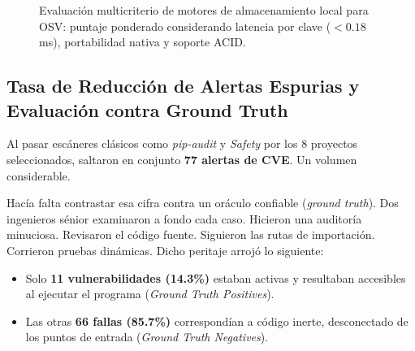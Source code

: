 \documentclass[conference]{IEEEtran}
\begin{document}
\begin{figure}[!htbp]
\centering
{}
\caption{Evaluación multicriterio de motores de almacenamiento local para OSV: puntaje ponderado considerando latencia por clave ($<0.18$ ms), portabilidad nativa y soporte ACID.}
\label{fig:evaluacion_bd}
\end{figure}

\subsection{Tasa de Reducción de Alertas Espurias y Evaluación contra Ground Truth}
Al pasar escáneres clásicos como \textit{pip-audit} y \textit{Safety} por los 8 proyectos seleccionados, saltaron en conjunto \textbf{77 alertas de CVE}. Un volumen considerable.

Hacía falta contrastar esa cifra contra un oráculo confiable (\textit{ground truth}). Dos ingenieros sénior examinaron a fondo cada caso. Hicieron una auditoría minuciosa. Revisaron el código fuente. Siguieron las rutas de importación. Corrieron pruebas dinámicas. Dicho peritaje arrojó lo siguiente:
\begin{itemize}
    \item Solo \textbf{11 vulnerabilidades (14.3\%)} estaban activas y resultaban accesibles al ejecutar el programa (\textit{Ground Truth Positives}).
    \item Las otras \textbf{66 fallas (85.7\%)} correspondían a código inerte, desconectado de los puntos de entrada (\textit{Ground Truth Negatives}).
\end{itemize}
\end{document}
